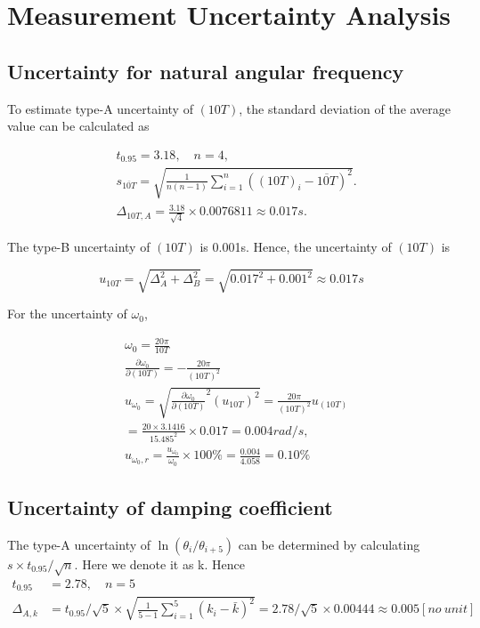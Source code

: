 \section{Measurement Uncertainty Analysis}

\subsection{Uncertainty for natural angular frequency}

To estimate type-A uncertainty of $(10T)$,
the standard deviation of the average value can be calculated as

\[
\begin{split}
&t_{0.95}=3.18,\quad n=4,\\
&s_{\overline{10T}}=\sqrt{\frac{1}{n(n-1)}\sum_{i=1}^n((10T)_i-\overline{10T})^2}.\\ 
&\Delta_{10T,A}=\frac{3.18}{\sqrt{4}}\times0.0076811\approx 0.017s.
\end{split}
\]

The type-B uncertainty of $(10T)$ is 0.001s. Hence, the uncertainty of $(10T)$ is

$$ u_{10T}=\sqrt{\Delta_A^2+\Delta_B^2}=\sqrt{0.017^2+0.001^2}\approx 0.017s $$  

For the uncertainty of $\omega_0$,

\[
\begin{split}
&\omega_0=\frac{20\pi}{10T}\\
&\frac{\partial \omega_0}{\partial (10T)}=-\frac{20\pi}{(10T)^2}\\
&u_{\omega_0}=\sqrt{\frac{\partial \omega_0}{\partial
    (10T)}^2(u_{10T})^2}=\frac{20\pi}{(10T)^2}u_{(10T)}\\
&=\frac{20\times3.1416}{15.485^2} \times 0.017 = 0.004rad/s,\\  
&u_{\omega_0,r}=\frac{u_{\omega_0}}{\omega_0}\times100\%=\frac{0.004}{4.058}=0.10\%
\end{split}
\]


\subsection{Uncertainty of damping coefficient}
    The type-A uncertainty of $\ln(\theta_i/\theta_{i+5})$ can be determined by calculating $s\times t_{0.95}/\sqrt{n}$. Here we denote it as k. Hence
    \[
    \begin{split}
        t_{0.95}&=2.78,\quad n=5\\
        \Delta_{A,k}&=t_{0.95}/\sqrt{5}\times \sqrt{\frac{1}{5-1}\sum_{i=1}^5(k_i-\bar{k})^2}=2.78/\sqrt{5}\times 0.00444\approx0.005[no\ unit]
    \end{split}
    \]

